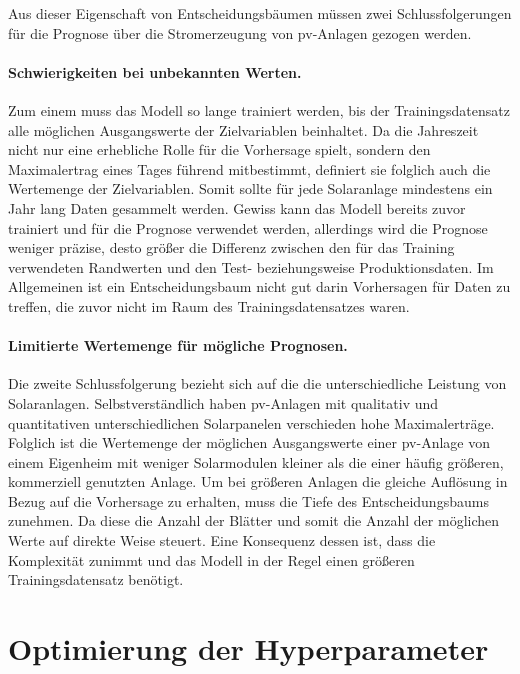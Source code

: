 \documentclass[12pt, a4paper]{article}
\begin{document}
Aus dieser Eigenschaft von Entscheidungsbäumen müssen zwei Schlussfolgerungen für die Prognose über die Stromerzeugung von \ac{pv}-Anlagen gezogen werden. 

\paragraph{Schwierigkeiten bei unbekannten Werten.} 

Zum einem muss das Modell so lange trainiert werden, bis der Trainingsdatensatz alle möglichen Ausgangswerte der Zielvariablen beinhaltet. Da die Jahreszeit nicht nur eine erhebliche Rolle für die Vorhersage spielt, sondern den Maximalertrag eines Tages führend mitbestimmt, definiert sie folglich auch die Wertemenge der Zielvariablen. Somit sollte für jede Solaranlage mindestens ein Jahr lang Daten gesammelt werden. Gewiss kann das Modell bereits zuvor trainiert und für die Prognose verwendet werden, allerdings wird die Prognose weniger präzise, desto größer die Differenz zwischen den für das Training verwendeten Randwerten und den Test- beziehungsweise Produktionsdaten. Im Allgemeinen ist ein Entscheidungsbaum nicht gut darin Vorhersagen für Daten zu treffen, die zuvor nicht im Raum des Trainingsdatensatzes waren.

\paragraph{Limitierte Wertemenge für mögliche Prognosen.}

Die zweite Schlussfolgerung bezieht sich auf die die unterschiedliche Leistung von Solaranlagen. Selbstverständlich haben \ac{pv}-Anlagen mit qualitativ und quantitativen unterschiedlichen Solarpanelen verschieden hohe Maximalerträge. Folglich ist die Wertemenge der möglichen Ausgangswerte einer \ac{pv}-Anlage von einem Eigenheim mit weniger Solarmodulen kleiner als die einer häufig größeren, kommerziell genutzten Anlage. Um bei größeren Anlagen die gleiche Auflösung in Bezug auf die Vorhersage zu erhalten, muss die Tiefe des Entscheidungsbaums zunehmen. Da diese die Anzahl der Blätter und somit die Anzahl der möglichen Werte auf direkte Weise steuert. Eine Konsequenz dessen ist, dass die Komplexität zunimmt und das Modell in der Regel einen größeren Trainingsdatensatz benötigt.

\newpage

\section{Optimierung der Hyperparameter}
\label{sec:hyperparameters}
\end{document}
